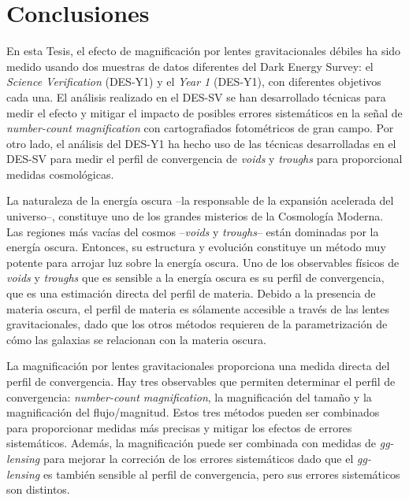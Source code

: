 \section*{Conclusiones}
En esta Tesis, el efecto de magnificaci\'on por lentes gravitacionales d\'ebiles ha sido medido usando dos muestras de datos diferentes del Dark Energy Survey: el {\it Science Verification} (DES-Y1) y el {\it Year 1} (DES-Y1), con diferentes objetivos cada una. El an\'alisis realizado en el DES-SV se han desarrollado t\'ecnicas para medir el efecto y mitigar el impacto de posibles errores sistem\'aticos en la se\~nal de {\it number-count magnification} con cartografiados fotom\'etricos de gran campo. Por otro lado, el an\'alisis del DES-Y1 ha hecho uso de las t\'ecnicas desarrolladas en el DES-SV para medir el perfil de convergencia de {\it voids} y {\it troughs} para proporcional medidas cosmol\'ogicas.
\newline

La naturaleza de la energ\'ia oscura --la responsable de la expansi\'on acelerada del universo--, constituye uno de los grandes misterios de la Cosmolog\'ia Moderna. Las regiones m\'as vac\'ias del cosmos --{\it voids} y {\it troughs}-- est\'an dominadas por la energ\'ia oscura. Entonces, su estructura y evoluci\'on constituye un m\'etodo muy potente para arrojar luz sobre la energ\'ia oscura. Uno de los observables f\'isicos de {\it voids} y {\it troughs} que es sensible a la energ\'ia oscura es su perfil de convergencia, que es una estimaci\'on directa del perfil de materia. Debido a la presencia de materia oscura, el perfil de materia es s\'olamente accesible a trav\'es de las lentes gravitacionales, dado que los otros m\'etodos requieren de la parametrizaci\'on de c\'omo las galaxias se relacionan con la materia oscura.
\newline

La magnificaci\'on por lentes gravitacionales proporciona una medida directa del perfil de convergencia. Hay tres observables que permiten determinar el perfil de convergencia: {\it number-count magnification}, la magnificaci\'on del tama\~no y la magnificaci\'on del flujo/magnitud. Estos tres m\'etodos pueden ser combinados para proporcionar medidas m\'as precisas y mitigar los efectos de errores sistem\'aticos. Adem\'as, la magnificaci\'on puede ser combinada con medidas de {\it gg-lensing} para mejorar la correci\'on de los errores sistem\'aticos dado que el {\it gg-lensing} es tambi\'en sensible al perfil de convergencia, pero sus errores sistem\'aticos son distintos.